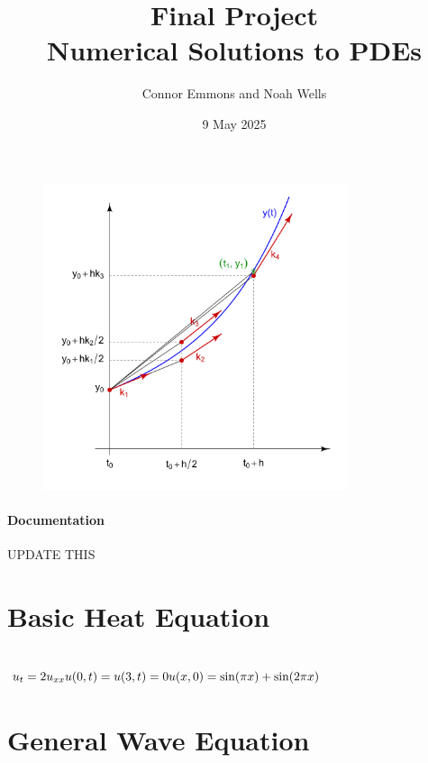 \documentclass{article}
\title{Final Project\\Numerical Solutions to PDEs}
\date{9 May 2025}
\author{Connor Emmons and Noah Wells}
\begin{document}
\maketitle
\begin{figure}[h]
    \centering
    \includegraphics[width=0.8\textwidth]{title.jpg}
\end{figure}
\vfill
\paragraph*{Documentation}
UPDATE THIS
\newpage
{}

\section{Basic Heat Equation}

\subsection*{$u_t = 2u_{xx}\\u(0,t) = u(3,t) = 0\\u(x,0) = \sin(\pi x) + \sin(2\pi x)$}

\section{General Wave Equation}
\end{document}
